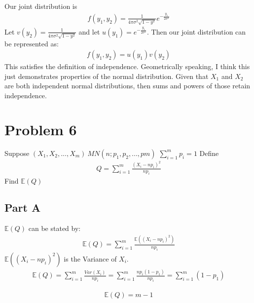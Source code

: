 \documentclass{article}
\begin{document}
Our joint distribution is
\begin{align*}
f(y_1,y_2) = \frac{1}{4 \pi \sigma^2 \sqrt{1-y^2}} e^{-\frac{y_1}{2\sigma^2}}
\end{align*}
Let $v(y_2) = \frac{1}{4 \pi \sigma^2 \sqrt{1-y^2}}$ and let $u(y_1) = e^{-\frac{y_1}{2\sigma^2}}$. Then our joint distribution can be represented as:
\begin{align*}
f(y_1,y_2) = u(y_1) v(y_2)
\end{align*}
This satisfies the definition of independence. Geometrically speaking, I think this just demonstrates properties of the normal distribution. Given that $X_1$ and $X_2$ are both independent normal distributions, then sums and powers of those retain independence.


\pagebreak


\section*{Problem 6}
Suppose $(X_1, X_2,...,X_m) ~ MN(n; p_1, p_2,..., pm)$
$\sum_{i=1}^{m} p_i = 1$ Define
\begin{align*}
Q = \sum_{i=1}^{m} \frac{(X_i-n p_i)^2}{n p_i}
\end{align*}
Find $\mathbb{E}(Q)$
\subsection*{Part A}
$\mathbb{E}(Q)$ can be stated by:
\begin{align*}
\mathbb{E}(Q) = \sum_{i=1}^{m} \frac{\mathbb{E}((X_i-n p_i)^2)}{n p_i}
\end{align*}
$\mathbb{E}((X_i-n p_i)^2)$ is the Variance of $X_i$.
\begin{align*}
\mathbb{E}(Q) = \sum_{i=1}^{m} \frac{Var(X_i)}{n p_i} = \sum_{i=1}^{m} \frac{n p_i (1-p_1)}{n p_i} = \sum_{i=1}^{m} (1-p_1)
\end{align*}

\begin{align*}
\boxed{ \mathbb{E}(Q) = m-1 }
\end{align*}
\end{document}
